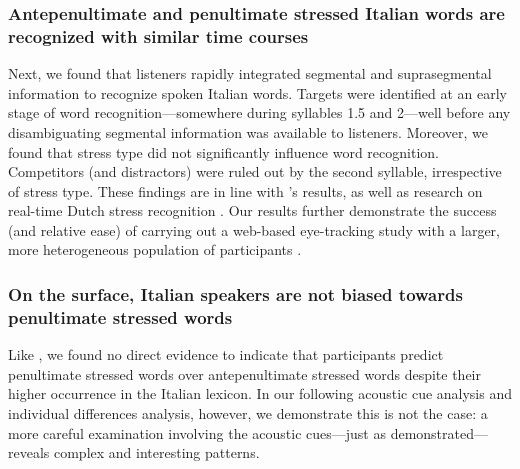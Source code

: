 \subsubsection{Antepenultimate and penultimate stressed Italian words are recognized with similar time courses}
Next, we found that listeners rapidly integrated segmental and suprasegmental information to recognize spoken Italian words. Targets were identified at an early stage of word recognition---somewhere during syllables 1.5 and 2---well before any disambiguating segmental information was available to listeners. Moreover, we found that stress type did not significantly influence word recognition. Competitors (and distractors) were ruled out by the second syllable, irrespective of stress type. These findings are in line with \cite{Sulpizio_McQueen_2012}'s results, as well as research on real-time Dutch stress recognition \citep{Reinisch2010}. Our results further demonstrate the success (and relative ease) of carrying out a web-based eye-tracking study with a larger, more heterogeneous population of participants \citep{Vos_2017, bramlett_wiener_24-AOW}.

\subsubsection{On the surface, Italian speakers are not biased towards penultimate stressed words}
Like \cite{Sulpizio_McQueen_2012}, we found no direct evidence to indicate that participants predict penultimate stressed words over antepenultimate stressed words despite their higher occurrence in the Italian lexicon. In our following acoustic cue analysis and individual differences analysis, however, we demonstrate this is not the case: a more careful examination involving the acoustic cues---just as \cite{Sulpizio_McQueen_2012} demonstrated---reveals complex and interesting patterns.

